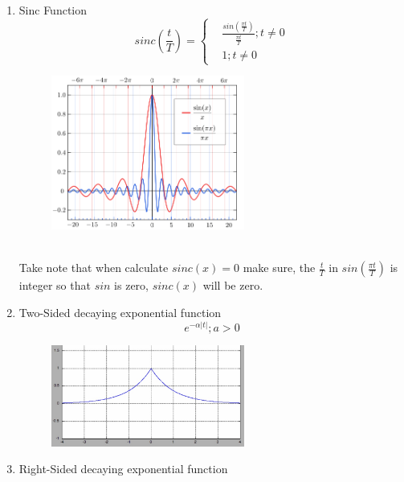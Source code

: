\documentclass{article}
\begin{document}
\begin{enumerate}
    \newpage
    \item Sinc Function
    \begin{equation}
    sinc(\frac{t}{T}) = 
        \begin{cases}
            & \frac{sin(\frac{\pi t}{T})}{\frac{\pi t}{T}} ;  t \neq 0\\
            & 1 ; t \neq 0
        \end{cases}
    \end{equation}
    \begin{figure}[h]
        \centering
        \includegraphics[width=0.6\textwidth]{image/sinc.png}
        \label{fig:enter-label}
    \end{figure}
    \\
    Take note that when calculate $sinc(x) = 0$ make sure, the $\frac{t}{T}$ in $sin(\frac{\pi t}{T})$ is integer so that $sin$ is zero, $sinc(x)$ will be zero.
    \item Two-Sided decaying exponential function
    \begin{equation}
        e^{-\alpha |t|} ; a > 0
    \end{equation}
    \begin{figure}[h]
        \centering
        \includegraphics[width=0.6\textwidth]{image/exponential.jpg}
        \label{fig:enter-label}
    \end{figure}
    \item Right-Sided decaying exponential function
    \begin{equation}

\end{equation}
\end{enumerate}
\end{document}

